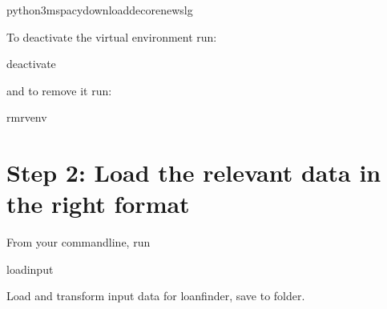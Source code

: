 \documentclass[letterpaper,10pt,english]{sphinxmanual}
\begin{document}
\begin{sphinxVerbatim}[commandchars=\\\{\}]
python3\PYGZhy{}mspacydownloadde\PYGZus{}core\PYGZus{}news\PYGZus{}lg
\end{sphinxVerbatim}

\sphinxAtStartPar
To deactivate the virtual environment run:

\begin{sphinxVerbatim}[commandchars=\\\{\}]
deactivate
\end{sphinxVerbatim}

\sphinxAtStartPar
and to remove it run:

\begin{sphinxVerbatim}[commandchars=\\\{\}]
rm\PYGZhy{}rvenv
\end{sphinxVerbatim}


\section{Step 2: Load the relevant data in the right format}
\label{\detokenize{workflow:step-2-load-the-relevant-data-in-the-right-format}}
\sphinxAtStartPar
From your command\sphinxhyphen{}line, run

\begin{sphinxVerbatim}[commandchars=\\\{\}]
loadinput
\end{sphinxVerbatim}
\label{\detokenize{workflow:module-gothuncommands.loadinput}}
\sphinxAtStartPar
Load and transform input data for loanfinder, save to  folder.
\end{document}
